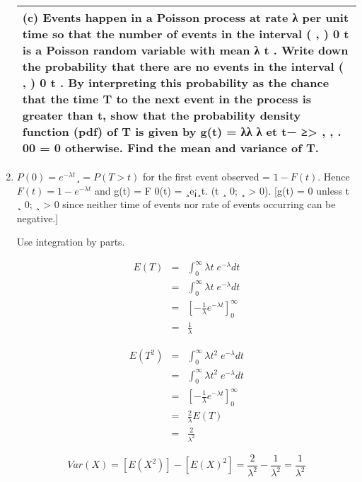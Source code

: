 \documentclass[a4paper,12pt]{article}
\begin{document}
\begin{enumerate}
\newpage
  \begin{table}[ht!]
     \centering
     \begin{tabular}{|p{15cm}|}
     \hline  
(c) Events happen in a Poisson process at rate  
λ
 per unit time so that the number of
events in the interval ( , ) 0 t is a Poisson random variable with mean 
λ t .  Write down
the probability that there are no events in the interval ( , ) 0 t .  By interpreting this probability as the chance that the time T to the next event in the process is greater than t, show that the probability density function (pdf) of T is given by
g(t) = 
λλ λ et t− ≥> , , . 00
    = 0  otherwise.
Find the mean and variance of T.
\\ \hline
      \end{tabular}
    \end{table}
    
\item  $P(0) = e^{-\lambda t}¸ = P(T > t)$ for the first event observed = $1 - F(t)$. Hence
$F(t) = 1 - e^{-\lambda t}$ and g(t) = F
0(t) = ¸e¡¸t. (t ¸ 0; ¸ > 0).
[g(t) = 0 unless t ¸ 0; ¸ > 0 since neither time of events nor rate of events
occurring can be negative.] 


Use integration by parts.


\begin{eqnarray*}
E(T) &=& \int^{\infty}_{0} \lambda t\;e^{-\lambda} dt \\
    &=&\int^{\infty}_{0} \lambda t\;e^{-\lambda} dt \\
    &=& \left[ -\frac{1}{\lambda}e^{-\lambda t} \right]^{\infty}_{0}\\
    &=& \frac{1}{\lambda}  
\end{eqnarray*}

\begin{eqnarray*}
E(T^2) &=& \int^{\infty}_{0} \lambda t^2\;e^{-\lambda} dt \\
    &=&\int^{\infty}_{0} \lambda t^2\;e^{-\lambda} dt \\
    &=& \left[ -\frac{1}{\lambda}e^{-\lambda t} \right]^{\infty}_{0}\\
    &=& \frac{2}{\lambda}E(T)\\
    &=& \frac{2}{\lambda^2}  
\end{eqnarray*}

\[ Var(X) = [E(X^2)] - [E(X)^2] = \frac{2}{\lambda^2} - \frac{1}{\lambda^2} 
     = \frac{1}{\lambda^2} \]


\end{enumerate}
\end{document}
